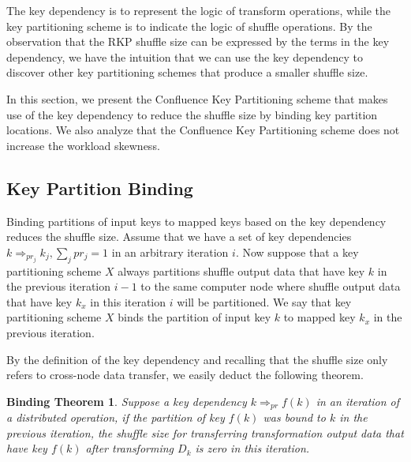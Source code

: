 \documentclass[10pt,journal,compsoc]{IEEEtran}
\begin{document}
The key dependency is to represent the logic of transform operations, 
while the key partitioning scheme is to indicate the logic of shuffle operations. 
By the observation that the RKP shuffle size can be expressed by the terms in the key dependency, we have the intuition that we can
use the key dependency to discover other key partitioning schemes that produce a smaller shuffle size. 

In this section, we present the Confluence Key Partitioning scheme
that makes use of the key dependency to reduce the shuffle size by binding 
key partition locations. 
We also analyze that the Confluence Key Partitioning scheme does not 
increase the workload skewness.


\subsection{Key Partition Binding}\label{section:binding}
Binding partitions of input keys to mapped keys based on the key dependency reduces the shuffle size.
Assume that we have a set of key 
dependencies $k \Rightarrow_{pr_j} k_j, \sum_{j} pr_j = 1$ in an arbitrary iteration $i$. 
Now suppose that a key partitioning scheme $X$ always partitions 
shuffle output data that have key $k$ in the previous iteration $i-1$ to the same computer node where 
shuffle output data that have key $k_x$ in this iteration $i$ will be partitioned. 
We say that key partitioning scheme $X$ binds the partition of 
input key $k$ to mapped key $k_x$ in the previous iteration. 

By the definition of the key dependency and recalling that 
the shuffle size only refers to cross-node data transfer,
we easily deduct the following theorem.
\newtheorem*{theorem*}{\textbf{Binding Theorem}}
\begin{theorem*}\label{thm:binding}
Suppose a key dependency $k \Rightarrow_{pr} f(k)$ in an iteration of a distributed operation,
if the partition of key $f(k)$ was bound to $k$ in the previous iteration, 
the shuffle size for transferring transformation output data that have key $f(k)$ after transforming $D_k$ is zero in this iteration.
\end{theorem*}
\end{document}

